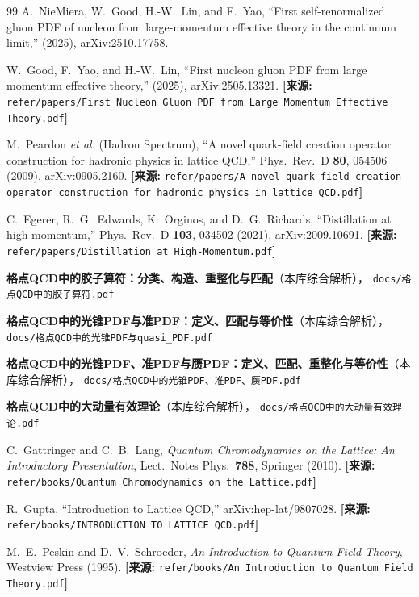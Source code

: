 \documentclass[12pt,a4paper]{ctexart}
\theoremstyle{definition}
\begin{document}
\begin{thebibliography}{99}
A.~NieMiera, W.~Good, H.-W.~Lin, and F.~Yao,
``First self-renormalized gluon PDF of nucleon from large-momentum effective theory in the continuum limit,''
(2025), arXiv:2510.17758.

W.~Good, F.~Yao, and H.-W.~Lin,
``First nucleon gluon PDF from large momentum effective theory,''
(2025), arXiv:2505.13321.
\quad\textbf{[来源:} \texttt{refer/papers/First Nucleon Gluon PDF from Large Momentum Effective Theory.pdf}\textbf{]}

M.~Peardon \textit{et al.} (Hadron Spectrum),
``A novel quark-field creation operator construction for hadronic physics in lattice QCD,''
Phys.\ Rev.\ D \textbf{80}, 054506 (2009), arXiv:0905.2160.
\quad\textbf{[来源:} \texttt{refer/papers/A novel quark-field creation operator construction for hadronic physics in lattice QCD.pdf}\textbf{]}

C.~Egerer, R.~G.~Edwards, K.~Orginos, and D.~G.~Richards,
``Distillation at high-momentum,''
Phys.\ Rev.\ D \textbf{103}, 034502 (2021), arXiv:2009.10691.
\quad\textbf{[来源:} \texttt{refer/papers/Distillation at High-Momentum.pdf}\textbf{]}

\textbf{格点QCD中的胶子算符：分类、构造、重整化与匹配}（本库综合解析），
\texttt{docs/格点QCD中的胶子算符.pdf}

\textbf{格点QCD中的光锥PDF与准PDF：定义、匹配与等价性}（本库综合解析），
\texttt{docs/格点QCD中的光锥PDF与quasi\_PDF.pdf}

\textbf{格点QCD中的光锥PDF、准PDF与赝PDF：定义、匹配、重整化与等价性}（本库综合解析），
\texttt{docs/格点QCD中的光锥PDF、准PDF、赝PDF.pdf}

\textbf{格点QCD中的大动量有效理论}（本库综合解析），
\texttt{docs/格点QCD中的大动量有效理论.pdf}

C.~Gattringer and C.~B.~Lang,
\textit{Quantum Chromodynamics on the Lattice: An Introductory Presentation},
Lect.\ Notes Phys.\ \textbf{788}, Springer (2010).
\quad\textbf{[来源:} \texttt{refer/books/Quantum Chromodynamics on the Lattice.pdf}\textbf{]}

R.~Gupta,
``Introduction to Lattice QCD,''
arXiv:hep-lat/9807028.
\quad\textbf{[来源:} \texttt{refer/books/INTRODUCTION TO LATTICE QCD.pdf}\textbf{]}

M.~E.~Peskin and D.~V.~Schroeder,
\textit{An Introduction to Quantum Field Theory},
Westview Press (1995).
\quad\textbf{[来源:} \texttt{refer/books/An Introduction to Quantum Field Theory.pdf}\textbf{]}

\end{thebibliography}
\end{document}
